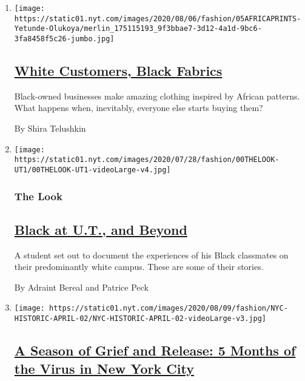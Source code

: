 \begin{enumerate}
\def\labelenumi{\arabic{enumi}.}
\item
  \texttt{[image: https://static01.nyt.com/images/2020/08/06/fashion/05AFRICAPRINTS-Yetunde-Olukoya/merlin\_175115193\_9f3bbae7-3d12-4a1d-9bc6-3fa8458f5c26-jumbo.jpg]}

  \hypertarget{white-customers-black-fabrics}{%
  \subsection{\texorpdfstring{\href{/2020/08/06/style/white-customers-black-fabrics.html}{White
  Customers, Black
  Fabrics}}{White Customers, Black Fabrics}}\label{white-customers-black-fabrics}}

  Black-owned businesses make amazing clothing inspired by African
  patterns. What happens when, inevitably, everyone else starts buying
  them?

  By Shira Telushkin
\item
  \texttt{[image: https://static01.nyt.com/images/2020/07/28/fashion/00THELOOK-UT1/00THELOOK-UT1-videoLarge-v4.jpg]}

  \hypertarget{the-look}{%
  \subsubsection{The Look}\label{the-look}}

  \hypertarget{black-at-ut-and-beyond}{%
  \subsection{\texorpdfstring{\href{/2020/08/08/style/black-yearbook-university-texas-austin.html}{Black
  at U.T., and
  Beyond}}{Black at U.T., and Beyond}}\label{black-at-ut-and-beyond}}

  A student set out to document the experiences of his Black classmates
  on their predominantly white campus. These are some of their stories.

  By Adraint Bereal and Patrice Peck
\item
  \texttt{[image: https://static01.nyt.com/images/2020/08/09/fashion/NYC-HISTORIC-APRIL-02/NYC-HISTORIC-APRIL-02-videoLarge-v3.jpg]}

  \hypertarget{a-season-of-grief-and-release-5-months-of-the-virus-in-new-york-city}{%
  \subsection{\texorpdfstring{\href{/2020/08/07/style/coronavirus-nyc-historic-season.html}{A
  Season of Grief and Release: 5 Months of the Virus in New York
  City}}{A Season of Grief and Release: 5 Months of the Virus in New York City}}\label{a-season-of-grief-and-release-5-months-of-the-virus-in-new-york-city}}


\end{enumerate}
